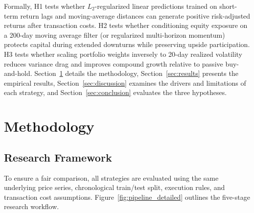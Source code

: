 \documentclass[11pt, a4paper]{article}
\begin{document}
Formally, H1 tests whether $L_2$-regularized linear predictions trained on short-term return lags and moving-average distances can generate positive risk-adjusted returns after transaction costs. H2 tests whether conditioning equity exposure on a 200-day moving average filter (or regularized multi-horizon momentum) protects capital during extended downturns while preserving upside participation. H3 tests whether scaling portfolio weights inversely to 20-day realized volatility reduces variance drag and improves compound growth relative to passive buy-and-hold. Section~\ref{sec:method} details the methodology, Section~\ref{sec:results} presents the empirical results, Section~\ref{sec:discussion} examines the drivers and limitations of each strategy, and Section~\ref{sec:conclusion} evaluates the three hypotheses.

\section{Methodology}
\label{sec:method}

\subsection{Research Framework}
To ensure a fair comparison, all strategies are evaluated using the same underlying price series, chronological train/test split, execution rules, and transaction cost assumptions. Figure~\ref{fig:pipeline_detailed} outlines the five-stage research workflow.
\end{document}
